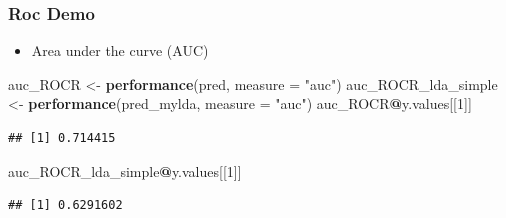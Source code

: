 \documentclass[
  shownotes,
  xcolor={svgnames},
  hyperref={colorlinks,citecolor=DarkBlue,linkcolor=DarkRed,urlcolor=DarkBlue}
  , aspectratio=169]{beamer}
\newenvironment{Shaded}{\begin{snugshade}}{\end{snugshade}}
\newcommand{\DataTypeTok}[1]{\textcolor[rgb]{0.13,0.29,0.53}{#1}}
\newcommand{\DecValTok}[1]{\textcolor[rgb]{0.00,0.00,0.81}{#1}}
\newcommand{\KeywordTok}[1]{\textcolor[rgb]{0.13,0.29,0.53}{\textbf{#1}}}
\newcommand{\NormalTok}[1]{#1}
\newcommand{\OperatorTok}[1]{\textcolor[rgb]{0.81,0.36,0.00}{\textbf{#1}}}
\newcommand{\StringTok}[1]{\textcolor[rgb]{0.31,0.60,0.02}{#1}}
\begin{document}
\begin{frame}[fragile]
\frametitle{Roc Demo}
\begin{itemize}
  \item Area under the curve (AUC)

\end{itemize}
\begin{scriptsize}
\begin{Shaded}
\begin{Highlighting}[]
\NormalTok{auc\_ROCR \textless{}{-}}\StringTok{ }\KeywordTok{performance}\NormalTok{(pred, }\DataTypeTok{measure =} \StringTok{"auc"}\NormalTok{)}
\NormalTok{auc\_ROCR\_lda\_simple \textless{}{-}}\StringTok{ }\KeywordTok{performance}\NormalTok{(pred\_mylda, }\DataTypeTok{measure =} \StringTok{"auc"}\NormalTok{)}
\NormalTok{auc\_ROCR}\OperatorTok{@}\NormalTok{y.values[[}\DecValTok{1}\NormalTok{]]}
\end{Highlighting}
\end{Shaded}

\begin{verbatim}
## [1] 0.714415
\end{verbatim}


\begin{Shaded}
\begin{Highlighting}[]
\NormalTok{auc\_ROCR\_lda\_simple}\OperatorTok{@}\NormalTok{y.values[[}\DecValTok{1}\NormalTok{]]}
\end{Highlighting}
\end{Shaded}


\begin{verbatim}
## [1] 0.6291602
\end{verbatim}
\end{scriptsize}

\end{frame}

\end{document}
